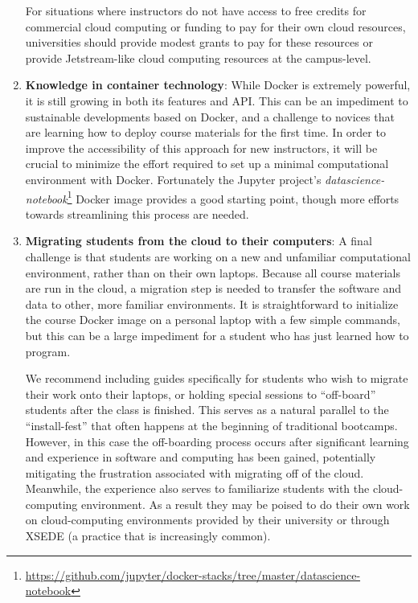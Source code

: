 \begin{enumerate}
For situations where instructors do not have access to free credits for
commercial cloud computing or funding to pay for their own
cloud resources, universities should provide modest grants to pay for
these resources or provide Jetstream-like cloud computing resources at the
campus-level.

\item {\bf Knowledge in container technology}: While Docker is extremely powerful,
it is still growing in both its features and API. This can be an impediment to
sustainable developments based on Docker, and a challenge to novices that are
learning how to deploy course materials for the first time. In order to improve
the accessibility of this approach for new instructors, it will be crucial to
minimize the effort required to set up a minimal computational environment with
Docker. Fortunately the Jupyter project's \textit{datascience-notebook}\footnote{\url{https://github.com/jupyter/docker-stacks/tree/master/datascience-notebook}}
Docker image provides a good starting point, though more efforts towards streamlining
this process are needed.

\item {\bf Migrating students from the cloud to their computers}: A final
challenge is that students are working on a new and
unfamiliar computational environment, rather than on their own laptops. Because
all course materials are run in the cloud, a migration step is
needed to transfer the software and data to other, more familiar environments.
It is straightforward to initialize the course Docker image on a
personal laptop with a
few simple commands, but this can be a large impediment for a student who has
just learned how to program.

We recommend including guides specifically for
students who wish to migrate their work onto their laptops, or holding special
sessions to ``off-board'' students after the class is finished. This serves as a
natural parallel to the ``install-fest'' that often happens at the
beginning of traditional bootcamps. However, in this case the
off-boarding process occurs after significant learning and experience in
software and computing has been gained, potentially mitigating the frustration
associated with migrating off of the cloud. Meanwhile, the experience also
serves to familiarize students with the cloud-computing environment. As a result
they may be poised to do their own work on cloud-computing environments
provided by their university or through XSEDE (a practice that is increasingly common).

\end{enumerate}

